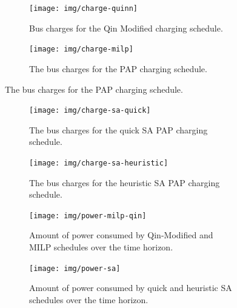 \documentclass[energies,article,submit,moreauthors]{Definitions/mdpi}
\begin{document}
\begin{figure}
  \begin{subfigure}[t]{\textwidth}
    \centering
    \texttt{[image: img/charge-quinn]}
    \caption{Bus charges for the Qin Modified charging schedule.}
    \label{subfig:qin-charge}
  \end{subfigure}
  \hfill
  \begin{subfigure}[t]{\textwidth}
    \centering
    \texttt{[image: img/charge-milp]}
    \caption{The bus charges for the PAP charging schedule.}
    \label{subfig:milp-charge}
  \end{subfigure}
  \hfill
\end{figure}

\begin{figure}\ContinuedFloat
  \begin{subfigure}[t]{\textwidth}
    \centering
    \texttt{[image: img/charge-sa-quick]}
    \caption{The bus charges for the quick SA PAP charging schedule.}
    \label{subfig:sa-quick-charge}
  \end{subfigure}
  \hfill
  \begin{subfigure}[t]{\textwidth}
    \centering
    \texttt{[image: img/charge-sa-heuristic]}
    \caption{The bus charges for the heuristic SA PAP charging schedule.}
    \label{subfig:sa-heuristic-charge}
  \end{subfigure}
  \caption{}
  \label{fig:charge}
\end{figure}

\begin{figure}
  \begin{subfigure}[t]{\textwidth}
    \centering
    \texttt{[image: img/power-milp-qin]}
    \caption{Amount of power consumed by Qin-Modified and MILP schedules over the time horizon.}
    \label{fig:power-usage-milp-qin}
  \end{subfigure}

  \hfill

  \begin{subfigure}[t]{\textwidth}
    \centering
    \texttt{[image: img/power-sa]}
    \caption{Amount of power consumed by quick and heuristic SA schedules over the time horizon.}
    \label{fig:power-usage-sa}
  \end{subfigure}
  \caption{}
  \label{fig:power}
\end{figure}
\end{document}
